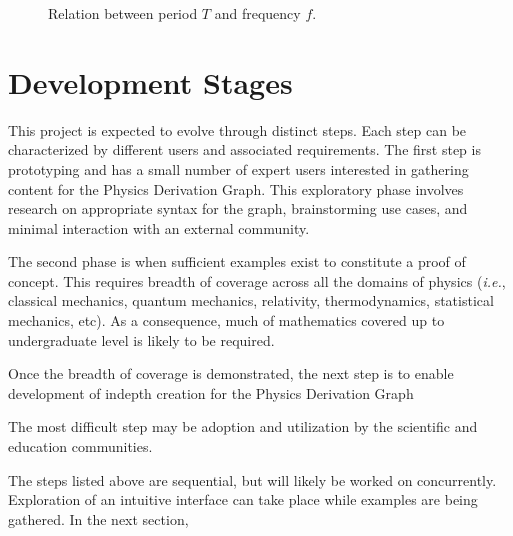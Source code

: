 \documentclass{article}
\newcommand{\ie}{\textit{i.e.}} %
\begin{document}
\begin{multicols}{2}
\begin{center}
\begin{figure}
\caption{Relation between period $T$ and frequency $f$.\label{fig:freq_period}}
\end{figure}
\end{center}
\section{Development Stages}

This project is expected to evolve through distinct steps. Each step can be characterized by different users and associated requirements. 
The first step is prototyping and has a small number of expert users interested in gathering content for the Physics Derivation Graph. This exploratory phase involves research on appropriate syntax for the graph, brainstorming use cases, and minimal interaction with an external community. 

The second phase is when sufficient examples exist to constitute a proof of concept. This requires breadth of coverage across all the domains of physics (\ie, classical mechanics, quantum mechanics, relativity, thermodynamics, statistical mechanics, etc). As a consequence, much of mathematics covered up to undergraduate level is likely to be required. 

Once the breadth of coverage is demonstrated, the next step is to enable development of indepth creation for the Physics Derivation Graph

The most difficult step may be adoption and utilization by the scientific and education communities. 

The steps listed above are sequential, but will likely be worked on concurrently. Exploration of an intuitive interface can take place while examples are being gathered. In the next section, 


\end{multicols}
\end{document}
